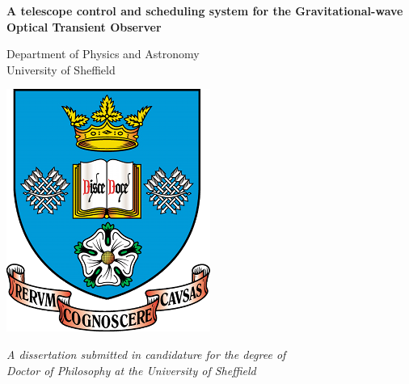 \vspace*{1cm}

\begin{center}
    \begin{Huge}
        \textbf{A telescope control and
               scheduling system for the
               Gravitational-wave Optical Transient Observer
               }
    \end{Huge}

    \vspace*{1.5cm}

    \begin{LARGE}
    \end{LARGE}

    \vspace*{1.5cm}

    \begin{Large}
        Department of Physics and Astronomy \\
        University of Sheffield
    \end{Large}

    \vspace*{2cm}

    \includegraphics[width=0.3\linewidth]{./images/University_of_Sheffield_coat_of_arms.png}

    \vspace*{1cm}

    \begin{large}
        \textit{A dissertation submitted in candidature for the degree of} \\
        \textit{Doctor of Philosophy at the University of Sheffield}
    \end{large}

    \vspace*{1.5cm}

    \begin{large}
        \text{\today}
    \end{large}

    \vfill
\end{center}
